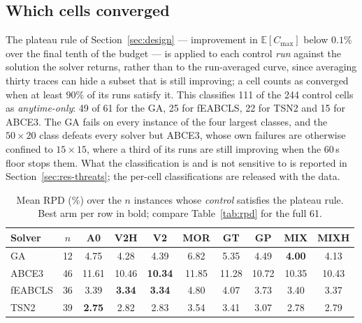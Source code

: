 \documentclass[review]{elsarticle}
\begin{document}
\subsection{Which cells converged}\label{sec:res-conv}

The plateau rule of Section~\ref{sec:design} --- improvement in
$\mathbb{E}[C_{\max}]$ below $0.1\%$ over the final tenth of the budget ---
is applied to each control \emph{run} against the solution the solver
returns, rather than to the run-averaged curve, since averaging thirty
traces can hide a subset that is still improving; a cell counts as
converged when at least $90\%$ of its runs satisfy it. This classifies 111
of the 244 control cells as \emph{anytime-only}: 49 of 61 for the GA, 25
for fEABCLS, 22 for TSN2 and 15 for ABCE3. The GA fails on every instance
of the four largest classes, and the $50\times20$ class defeats every
solver but ABCE3, whose own failures are otherwise confined to
$15\times15$, where a third of its runs are still improving when the
$60$\,s floor stops them. What the classification is and is not sensitive
to is reported in Section~\ref{sec:res-threats}; the per-cell
classifications are released with the data.

\begin{table}[htbp]
\centering
\caption{Mean RPD (\%) over the $n$ instances whose \emph{control}
satisfies the plateau rule. Best arm per row in bold; compare
Table~\ref{tab:rpd} for the full 61.}
\label{tab:conv}
\small
\begin{tabular}{lccccccccc}
\toprule
Solver & $n$ & A0 & V2H & V2 & MOR & GT & GP & MIX & MIXH \\
\midrule
GA      & 12 & 4.75 & 4.28 & 4.39 & 6.82 & 5.35 & 4.49 & \textbf{4.00} & 4.13 \\
ABCE3   & 46 & 11.61 & 10.46 & \textbf{10.34} & 11.85 & 11.28 & 10.72 & 10.35 & 10.43 \\
fEABCLS & 36 & 3.39 & \textbf{3.34} & \textbf{3.34} & 4.80 & 4.07 & 3.73 & 3.40 & 3.37 \\
TSN2    & 39 & \textbf{2.75} & 2.82 & 2.83 & 3.54 & 3.41 & 3.07 & 2.78 & 2.79 \\
\bottomrule
\end{tabular}
\end{table}
\end{document}
